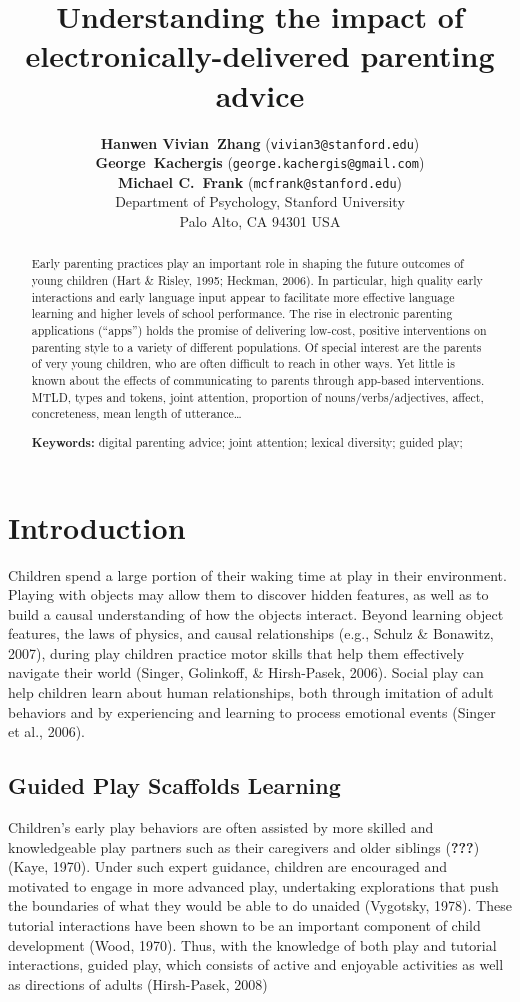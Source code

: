 \documentclass[10pt, letterpaper]{article}
\title{Understanding the impact of electronically-delivered parenting advice}
\author{{\large\bf Hanwen Vivian~Zhang} (\texttt{vivian3@stanford.edu}) \\ {\large\bf George~Kachergis} (\texttt{george.kachergis@gmail.com}) \\ {\large\bf Michael C.~Frank} (\texttt{mcfrank@stanford.edu}) \\  Department of Psychology, Stanford University \\  Palo Alto, CA 94301 USA}
\begin{document}
\maketitle

\begin{abstract}
Early parenting practices play an important role in shaping the future
outcomes of young children (Hart \& Risley, 1995; Heckman, 2006). In
particular, high quality early interactions and early language input
appear to facilitate more effective language learning and higher levels
of school performance. The rise in electronic parenting applications
(``apps'') holds the promise of delivering low-cost, positive
interventions on parenting style to a variety of different populations.
Of special interest are the parents of very young children, who are
often difficult to reach in other ways. Yet little is known about the
effects of communicating to parents through app-based interventions.
MTLD, types and tokens, joint attention, proportion of
nouns/verbs/adjectives, affect, concreteness, mean length of
utterance\ldots{}

\textbf{Keywords:}
digital parenting advice; joint attention; lexical diversity; guided
play;
\end{abstract}

\section{Introduction}\label{introduction}

Children spend a large portion of their waking time at play in their
environment. Playing with objects may allow them to discover hidden
features, as well as to build a causal understanding of how the objects
interact. Beyond learning object features, the laws of physics, and
causal relationships (e.g., Schulz \& Bonawitz, 2007), during play
children practice motor skills that help them effectively navigate their
world (Singer, Golinkoff, \& Hirsh-Pasek, 2006). Social play can help
children learn about human relationships, both through imitation of
adult behaviors and by experiencing and learning to process emotional
events (Singer et al., 2006).

\subsection{Guided Play Scaffolds
Learning}\label{guided-play-scaffolds-learning}

Children's early play behaviors are often assisted by more skilled and
knowledgeable play partners such as their caregivers and older siblings
({\textbf{???}})(Kaye, 1970). Under such expert guidance, children are
encouraged and motivated to engage in more advanced play, undertaking
explorations that push the boundaries of what they would be able to do
unaided (Vygotsky, 1978). These tutorial interactions have been shown to
be an important component of child development (Wood, 1970). Thus, with
the knowledge of both play and tutorial interactions, guided play, which
consists of active and enjoyable activities as well as directions of
adults (Hirsh-Pasek, 2008)
\end{document}
